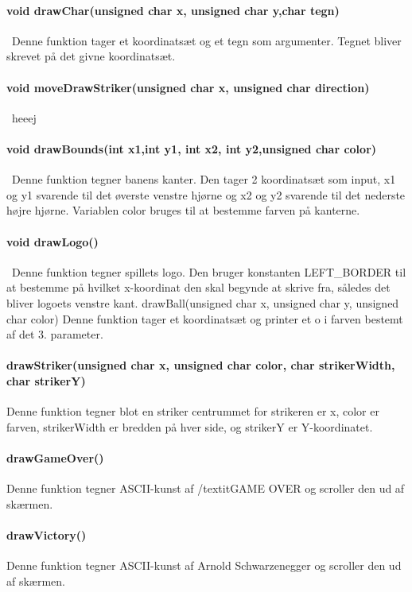 \paragraph{void drawChar(unsigned char x, unsigned char y,char tegn)}\
Denne funktion tager et koordinatsæt og et tegn som argumenter. Tegnet bliver skrevet på det givne koordinatsæt.

\paragraph{void moveDrawStriker(unsigned char x, unsigned char direction)}\
heeej

\paragraph{void drawBounds(int x1,int y1, int x2, int y2,unsigned char color)}\
Denne funktion tegner banens kanter. Den tager 2 koordinatsæt som input, x1 og y1 svarende til det øverste venstre hjørne og  x2 og y2 svarende til det nederste højre hjørne. Variablen color bruges til at bestemme farven på kanterne. 

\paragraph{void drawLogo()}\
Denne funktion tegner spillets logo. Den bruger konstanten LEFT\_BORDER til at bestemme på hvilket x-koordinat den skal begynde at skrive fra, således det bliver logoets venstre kant.
drawBall(unsigned char x, unsigned char y, unsigned char color)
Denne funktion tager et koordinatsæt og printer et o i farven bestemt af det 3. parameter.

\paragraph{drawStriker(unsigned char x, unsigned char color, char strikerWidth, char strikerY)}
Denne funktion tegner blot en striker centrummet for strikeren er x, color er farven, strikerWidth er bredden på hver side, og strikerY er Y-koordinatet.

\paragraph{drawGameOver()}
Denne funktion tegner ASCII-kunst af /textit{GAME OVER} og scroller den ud af skærmen.

\paragraph{drawVictory()}
Denne funktion tegner ASCII-kunst af Arnold Schwarzenegger og scroller den ud af skærmen.

